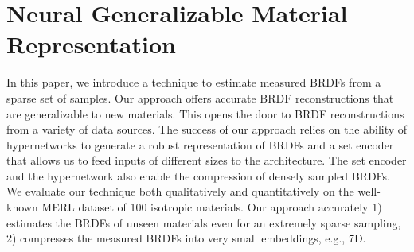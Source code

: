 \chapter{Neural Generalizable Material Representation}
In this paper, we introduce a technique to estimate measured BRDFs from a sparse set of samples. Our approach offers accurate BRDF reconstructions that are generalizable to new materials. This opens the door to BRDF reconstructions from a variety of data sources. The success of our approach relies on the ability of hypernetworks to generate a robust representation of BRDFs and a set encoder that allows us to feed inputs of different sizes to the architecture. The set encoder and the hypernetwork also enable the compression of densely sampled BRDFs. We evaluate our technique both qualitatively and quantitatively on the well-known MERL dataset of 100 isotropic materials. Our approach accurately 1) estimates the BRDFs of unseen materials even for an extremely sparse sampling, 2) compresses the measured BRDFs into very small embeddings, e.g., 7D.










